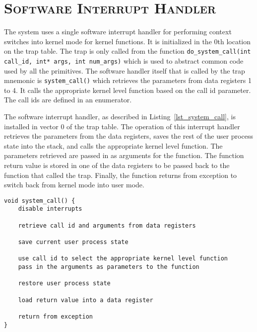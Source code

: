 \documentclass[oneside]{report}
\begin{document}
\section{\textsc{Software Interrupt Handler}}


The system uses a single software interrupt handler for performing context
switches into kernel mode for kernel functions. It is initialized in the 0th
location on the trap table. The trap is only called from the function
\texttt{do\_system\_call(int call\_id, int* args, int num\_args)} which is used
to abstract common code used by all the primitives. The software handler itself
that is called by the trap mnemonic is \texttt{system\_call()} which retrieves
the parameters from data registers 1 to 4. It calls the appropriate kernel
level function based on the call id parameter. The call ids are defined in an
enumerator. 

The software interrupt handler, as described in Listing~\ref{lst_system_call},
is installed in vector 0 of the trap table. The operation of this interrupt
handler retrieves the parameters from the data registers, saves the rest of
the user process state into the stack, and calls the appropriate kernel level
function. The parameters retrieved are passed in as arguments for the function.
The function return value is stored in one of the data registers to be passed
back to the function that called the trap. Finally, the function returns from
exception to switch back from kernel mode into user mode.

\begin{lstlisting}
void system_call() {
    disable interrupts

    retrieve call id and arguments from data registers

    save current user process state

    use call id to select the appropriate kernel level function 
    pass in the arguments as parameters to the function

    restore user process state

    load return value into a data register

    return from exception
}
\end{lstlisting}
\end{document}
